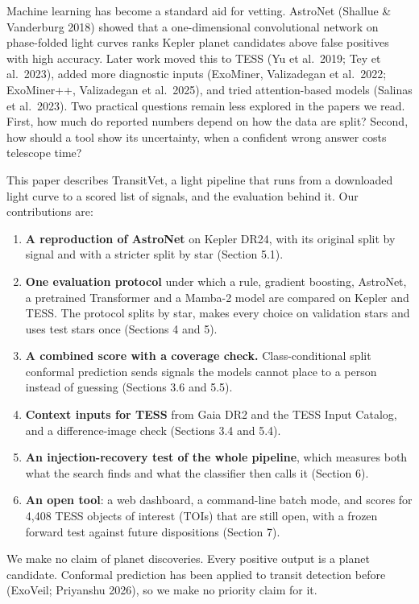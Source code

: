 \documentclass[
]{article}
\providecommand{\tightlist}{%
  \setlength{\itemsep}{0pt}\setlength{\parskip}{0pt}}
\begin{document}
Machine learning has become a standard aid for vetting. AstroNet
(Shallue \& Vanderburg 2018) showed that a one-dimensional convolutional
network on phase-folded light curves ranks Kepler planet candidates
above false positives with high accuracy. Later work moved this to TESS
(Yu et al.~2019; Tey et al.~2023), added more diagnostic inputs
(ExoMiner, Valizadegan et al.~2022; ExoMiner++, Valizadegan et
al.~2025), and tried attention-based models (Salinas et al.~2023). Two
practical questions remain less explored in the papers we read. First,
how much do reported numbers depend on how the data are split? Second,
how should a tool show its uncertainty, when a confident wrong answer
costs telescope time?

This paper describes TransitVet, a light pipeline that runs from a
downloaded light curve to a scored list of signals, and the evaluation
behind it. Our contributions are:

\begin{enumerate}
\def\labelenumi{\arabic{enumi}.}
\tightlist
\item
  \textbf{A reproduction of AstroNet} on Kepler DR24, with its original
  split by signal and with a stricter split by star (Section 5.1).
\item
  \textbf{One evaluation protocol} under which a rule, gradient
  boosting, AstroNet, a pretrained Transformer and a Mamba-2 model are
  compared on Kepler and TESS. The protocol splits by star, makes every
  choice on validation stars and uses test stars once (Sections 4 and
  5).
\item
  \textbf{A combined score with a coverage check.} Class-conditional
  split conformal prediction sends signals the models cannot place to a
  person instead of guessing (Sections 3.6 and 5.5).
\item
  \textbf{Context inputs for TESS} from Gaia DR2 and the TESS Input
  Catalog, and a difference-image check (Sections 3.4 and 5.4).
\item
  \textbf{An injection-recovery test of the whole pipeline}, which
  measures both what the search finds and what the classifier then calls
  it (Section 6).
\item
  \textbf{An open tool}: a web dashboard, a command-line batch mode, and
  scores for 4,408 TESS objects of interest (TOIs) that are still open,
  with a frozen forward test against future dispositions (Section 7).
\end{enumerate}

We make no claim of planet discoveries. Every positive output is a
planet candidate. Conformal prediction has been applied to transit
detection before (ExoVeil; Priyanshu 2026), so we make no priority claim
for it.
\end{document}
